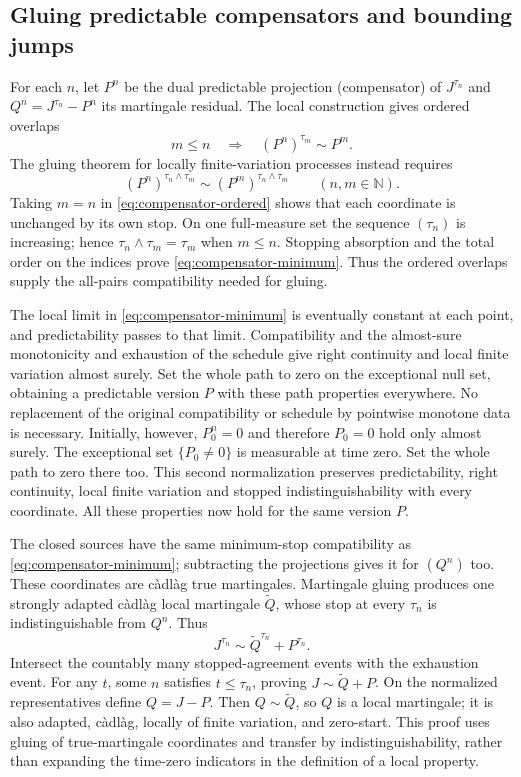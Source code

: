 \subsection{Gluing predictable compensators and bounding jumps}
For each $n$, let $P^n$ be the dual predictable projection (compensator) of $J^{\tau_n}$ and
$Q^n=J^{\tau_n}-P^n$ its martingale residual. The local construction gives
ordered overlaps
\begin{equation}
 m\leq n\quad\Longrightarrow\quad (P^n)^{\tau_m}\sim P^m.
 \label{eq:compensator-ordered}
\end{equation}
The gluing theorem for locally finite-variation processes instead requires
\begin{equation}
 (P^n)^{\tau_n\wedge\tau_m}\sim
 (P^m)^{\tau_n\wedge\tau_m}\qquad(n,m\in\mathbb N).
 \label{eq:compensator-minimum}
\end{equation}
Taking $m=n$ in \eqref{eq:compensator-ordered} shows that each coordinate is unchanged by its own
stop. On one full-measure set the sequence $(\tau_n)$ is increasing; hence
$\tau_n\wedge\tau_m=\tau_m$ when $m\leq n$.
Stopping absorption and the total order on the indices prove \eqref{eq:compensator-minimum}.
Thus the ordered overlaps supply the all-pairs compatibility needed for gluing.

The local limit in \eqref{eq:compensator-minimum} is eventually constant at each point, and
predictability passes to that limit. Compatibility and the almost-sure
monotonicity and exhaustion of the schedule give right continuity and
local finite variation almost surely. Set the whole path to zero on the
exceptional null set, obtaining a predictable version $P$ with these path
properties everywhere. No replacement of the original compatibility or
schedule by pointwise monotone data is necessary.
Initially, however, $P^n_0=0$ and therefore $P_0=0$ hold only almost surely.
The exceptional set $\{P_0\ne0\}$ is measurable at time zero. Set the whole
path to zero there too. This second normalization preserves predictability,
right continuity, local finite variation and stopped indistinguishability
with every coordinate. All these properties now hold for the same version $P$.

The closed sources have the same minimum-stop compatibility as \eqref{eq:compensator-minimum};
subtracting the projections gives it for $(Q^n)$ too. These coordinates
are c\`adl\`ag true martingales. Martingale gluing produces one strongly
adapted c\`adl\`ag local martingale $\widetilde Q$, whose stop at every
$\tau_n$ is indistinguishable from $Q^n$. Thus
\[
 J^{\tau_n}\sim\widetilde Q^{\tau_n}+P^{\tau_n}.
\]
Intersect the countably many stopped-agreement events with the exhaustion
event. For any $t$, some $n$ satisfies $t\leq\tau_n$, proving
$J\sim\widetilde Q+P$. On the normalized representatives define $Q=J-P$.
Then $Q\sim\widetilde Q$, so $Q$ is a local martingale; it is also adapted,
c\`adl\`ag, locally of finite variation, and zero-start.
This proof uses gluing of true-martingale coordinates and transfer by
indistinguishability, rather than expanding the time-zero indicators in
the definition of a local property.

